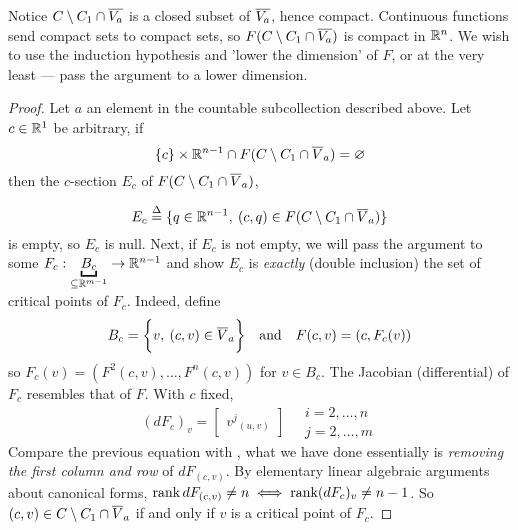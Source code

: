 \documentclass[../main-manifolds.tex]{subfiles}
\begin{document}
Notice $C\setminus C_1\cap \overline{V_a}$ is a closed subset of $\overline{V_a}$, hence compact. Continuous functions send compact sets to compact sets, so $F(C\setminus C_1\cap \overline{V_a})$ is compact in ${\mathbb{R}^n}$. We wish to use the induction hypothesis and 'lower the dimension' of $F$, or at the very least — pass the argument to a lower dimension.
\begin{step}\label{lee-sards-case1}
\end{step}
\begin{proof}
    Let $a$ an element in the countable subcollection described above. Let $c\in\mathbb{R}^{1}$ be arbitrary, if
    \[
        \{c\}\times\mathbb{R}^{n-1}\cap F(C\setminus C_1\cap \overline{V}_a)=\varnothing
    \]
    then the $c$-section $E_c$ of $F(C\setminus C_1\cap \overline{V}_a)$, 
    
    \[
    E_c \overset{\Delta}{=} \{q\in \mathbb{R}^{n-1},\: (c,q)\in F(C\setminus C_1\cap \overline{V}_a)\}
    \]
    is empty, so $E_c$ is null. Next, if $E_c$ is not empty, we will pass the argument to some $F_c: \underbracket{B_c}_{\subseteq \real^{m-1}}\to \real^{n-1}$ and show $E_c$ is \emph{exactly} (double inclusion) the set of critical points of $F_c$. Indeed, define
    \[
        B_c = \bigset{v,\: (c,v)\in\cl{V}_a}\qqtext{and}F(c,v)=(c,F_c(v))
    \]
    so $F_c(v) = (F^2(c,v),\ldots,F^{n}(c,v))$ for $v\in B_c$. The Jacobian (differential) of $F_c$ resembles that of $F$. With $c$ fixed,
    \[
        (dF_c)_v = \begin{bmatrix}
            {v^j}_{(u,v)}
        \end{bmatrix}\quad \substack{i=2,\ldots,n\\ j=2,\ldots,m}
    \]
    Compare the previous equation with , what we have done essentially is \emph{removing the first column and row} of $dF_{(c,v)}$. By elementary linear algebraic arguments about canonical forms, $\operatorname{rank} dF_{(c,v)}\neq n\iff \operatorname{rank} (dF_c)_v\neq n-1$. So $(c,v)\in C\setminus C_1\cap \overline{V}_a$ if and only if $v$ is a critical point of $F_c$. 
    
    
\end{proof}
\end{document}
